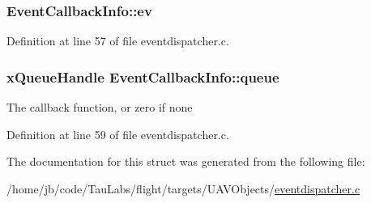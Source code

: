 \hypertarget{struct_event_callback_info_a437283aa345859ce2746a744069f63a5}{
\subsubsection[{ev}]{ {\bf \-Event\-Callback\-Info\-::ev}}}\label{struct_event_callback_info_a437283aa345859ce2746a744069f63a5}


\-Definition at line 57 of file eventdispatcher.\-c.

\hypertarget{struct_event_callback_info_a4caebba9d1c6e9e5e4c7194cec8c60a3}{
\subsubsection[{queue}]{\setlength{\rightskip}{0pt plus 5cm}x\-Queue\-Handle {\bf \-Event\-Callback\-Info\-::queue}}}\label{struct_event_callback_info_a4caebba9d1c6e9e5e4c7194cec8c60a3}
\-The callback function, or zero if none 

\-Definition at line 59 of file eventdispatcher.\-c.



\-The documentation for this struct was generated from the following file\-:\begin{DoxyCompactItemize}
\item 
/home/jb/code/\-Tau\-Labs/flight/targets/\-U\-A\-V\-Objects/\hyperlink{eventdispatcher_8c}{eventdispatcher.\-c}\end{DoxyCompactItemize}
